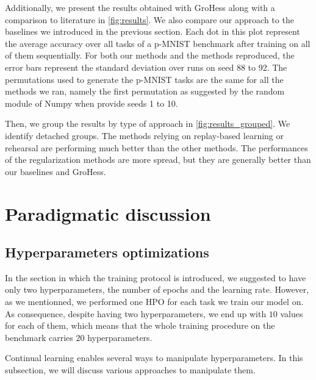 \documentclass[11pt]{article}
\begin{document}
Additionally, we present the results obtained with GroHess along with a comparison to literature in \ref{fig:results}. We also compare our approach to the baselines we introduced in the previous section. Each dot in this plot represent the average accuracy over all tasks of a p-MNIST benchmark after training on all of them sequentially. For both our methods and the methods reproduced, the error bars represent the standard deviation over runs on seed 88 to 92. The permutations used to generate the p-MNIST tasks are the same for all the methods we ran, namely the first permutation as suggested by the random module of Numpy when provide seeds 1 to 10.

\vspace{2mm}
\noindent
Then, we group the results by type of approach in \ref{fig:results_grouped}. We identify detached groups. The methods relying on replay-based learning or rehearsal are performing much better than the other methods. The performances of the regularization methods are more spread, but they are generally better than our baselines and GroHess.



\section{Paradigmatic discussion}



\subsection{Hyperparameters optimizations}


In the section in which the training protocol is introduced, we suggested to have only two hyperparameters, the number of epochs and the learning rate. However, as we mentionned, we performed one HPO for each task we train our model on. As consequence, despite having two hyperparameters, we end up with $10$ values for each of them, which means that the whole training procedure on the benchmark carries $20$ hyperparameters. 

\vspace{2mm}
\noindent
Continual learning enables several ways to manipulate hyperparameters. In this subsection, we will discuss various approaches to manipulate them. 
\end{document}
